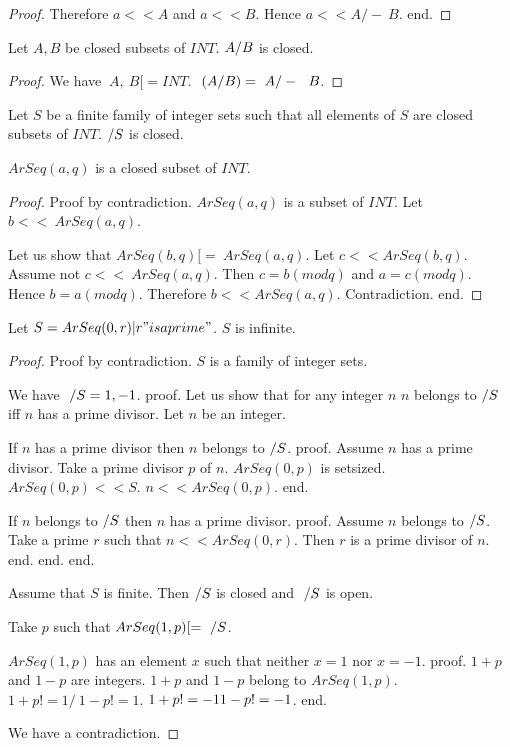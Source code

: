 \documentclass{article}
\begin{document}
\begin{forthel}
\begin{proof}
        Therefore $a << A$ and $a << B$. Hence $a << A /-\ B$.
      end.
    \end{proof}

    \begin{lemma}[UnionClosed]
      Let $A,B$ be closed subsets of $INT$. $A \-/ B$ is closed.
    \end{lemma}
    \begin{proof}
      We have $~A,~B [= INT$. $~(A \-/ B) = ~A /-\ ~B$.
    \end{proof}

    \begin{axiom}[UnionSClosed]
      Let $S$ be a finite family of integer sets such that all elements of $S$ are closed subsets of $INT$. $\-/ S$ is closed.
    \end{axiom}

    \begin{lemma}[ArSeqClosed]
      $ArSeq(a,q)$ is a closed subset of $INT$.
    \end{lemma}
    \begin{proof}
      Proof by contradiction. $ArSeq(a,q)$ is a subset of $INT$. Let $b << ~ArSeq (a,q)$.

      Let us show that $ArSeq(b,q) [= ~ArSeq(a,q)$. Let $c << ArSeq(b,q)$.
        Assume not $c << ~ArSeq(a,q)$. Then $c = b (mod q)$ and $a = c (mod q)$. Hence $b = a (mod q)$. Therefore $b << ArSeq(a,q)$. Contradiction.
      end.
    \end{proof}

    \begin{theorem}[Fuerstenberg]
      Let $S = {ArSeq(0,r) | r "is a prime"}$. $S$ is infinite.
    \end{theorem}
    \begin{proof}
      Proof by contradiction. $S$ is a family of integer sets.

      We have $~ \-/ S = {1, -1}$.
      proof.
        Let us show that for any integer $n$ $n$ belongs to $\-/ S$ iff $n$ has a prime divisor.
          Let $n$ be an integer.

          If $n$ has a prime divisor then $n$ belongs to $\-/ S$.
          proof.
            Assume $n$ has a prime divisor. Take a prime divisor $p$ of $n$. $ArSeq(0,p)$ is setsized. $ArSeq(0,p) << S$. $n << ArSeq(0,p)$.
          end.

          If $n$ belongs to $\-/ S$ then $n$ has a prime divisor.
          proof.
            Assume $n$ belongs to $\-/S$. Take a prime $r$ such that $n << ArSeq(0,r)$. Then $r$ is a prime divisor of $n$.
          end.
        end.
      end.

      Assume that $S$ is finite. Then $\-/ S$ is closed and $~ \-/ S$ is open.

      Take $p$ such that $ArSeq(1,p) [= ~ \-/ S$.

      $ArSeq(1,p)$ has an element $x$ such that neither $x = 1$ nor $x = -1$.
      proof.
        $1 + p$ and $1 - p$ are integers.
        $1 + p$ and $1 - p$ belong to $ArSeq(1,p)$. $1 + p !=  1 /\ 1 - p !=  1$. $1 + p != -1 \/ 1 - p != -1$.
      end.

      We have a contradiction.
    \end{proof}
  \end{forthel}
\end{document}
